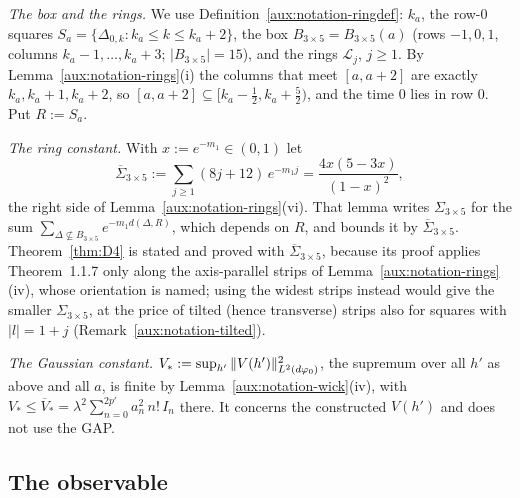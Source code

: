 \emph{The box and the rings.}  We use Definition~\ref{aux:notation-ringdef}: $k_a$, the row-$0$
squares $S_a=\{\Delta_{0,k}:k_a\le k\le k_a+2\}$, the box $B_{3\times5}=B_{3\times5}(a)$ (rows
$-1,0,1$, columns $k_a-1,\dots,k_a+3$; $|B_{3\times5}|=15$), and the rings $\mathcal L_j$, $j\ge1$.
By Lemma~\ref{aux:notation-rings}(i) the columns that meet $[a,a+2]$ are exactly
$k_a,k_a+1,k_a+2$, so $[a,a+2]\subseteq[k_a-\frac12,k_a+\frac52)$, and the time $0$ lies in
row $0$.  Put $R:=S_a$.

\emph{The ring constant.}  With $x:=e^{-m_1}\in(0,1)$ let
\[
 \overline\Sigma_{3\times5}:=\sum_{j\ge1}(8j+12)\,e^{-m_1j}=\frac{4x(5-3x)}{(1-x)^2},
\]
the right side of Lemma~\ref{aux:notation-rings}(vi).  That lemma writes $\Sigma_{3\times5}$ for
the sum $\sum_{\Delta\not\subseteq B_{3\times5}}e^{-m_1d(\Delta,R)}$, which depends on $R$, and
bounds it by $\overline\Sigma_{3\times5}$.  Theorem~\ref{thm:D4} is stated and proved with
$\overline\Sigma_{3\times5}$, because its proof applies Theorem~1.1.7 only along the axis-parallel
strips of Lemma~\ref{aux:notation-rings}(iv), whose orientation is named; using the widest strips
instead would give the smaller $\Sigma_{3\times5}$, at the price of tilted (hence transverse)
strips also for squares with $|l|=1+j$ (Remark~\ref{aux:notation-tilted}).

\emph{The Gaussian constant.}  $V_*:=\sup_{h'}\|V(h')\|_{L^2(d\varphi_0)}^2$, the supremum over all $h'$
as above and all $a$, is finite by Lemma~\ref{aux:notation-wick}(iv), with
$V_*\le\overline V_*=\lambda^2\sum_{n=0}^{2p'}a_n^2\,n!\,I_n$ there.  It concerns the
constructed $V(h')$ and does not use the GAP.

\subsection{The observable}\label{sub:d4-aux}

